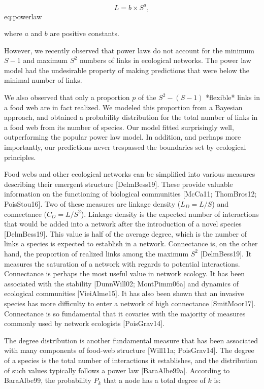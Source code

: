 $$ L = b \times S^a, $$ {eq:powerlaw}

where $a$ and $b$ are positive constants.

However, we recently observed that power laws do not account for the minimum
$S-1$ and maximum $S^2$ numbers of links in ecological networks. The power law model had the undesirable property of
making predictions that were below the minimal number of links.

We also observed that only a proportion $p$ of the $S^2 - (S-1)$ *flexible*
links in a food web are in fact realized. We modeled this proportion from a
Bayesian approach, and obtained a probability distribution for the total number
of links in a food web from its number of species. Our model fitted surprisingly
well, outperforming the popular power law model. In addition, and perhaps more
importantly, our predictions never trespassed the boundaries set by ecological
principles.

Food webs and
other ecological networks can be simplified into various measures describing
their emergent structure [DelmBess19]. These provide valuable information on
the functioning of biological communities [McCa11; ThomBros12; PoisStou16].
Two of these measures are linkage density ($L_D = L/S$) and connectance ($C_O =
L/S^2$). Linkage density is the expected number of interactions that would be
added into a network after the introduction of a novel species [DelmBess19].
This value is half of the average degree, which is the number of links a species
is expected to establish in a network. Connectance is, on the other hand, the
proportion of realized links among the maximum $S^2$ [DelmBess19]. It measures
the saturation of a network with regards to potential interactions. Connectance
is perhaps the most useful value in network ecology. It has been associated with
the stability [DunnWill02; MontPimm06a] and dynamics of ecological communities
[VieiAlme15]. It has also been shown that an invasive species has more
difficulty to enter a network of high connectance [SmitMoor17]. Connectance is
so fundamental that it covaries with the majority of measures commonly used by
network ecologists [PoisGrav14].

The degree distribution is another fundamental measure that has been associated
with many components of food-web structure [Will11a; PoisGrav14]. The degree
of a species is the total number of interactions it establishes, and the
distribution of such values typically follows a power law [BaraAlbe99a].
According to BaraAlbe99, the probability $P_k$ that a node has a total degree
of $k$ is:

